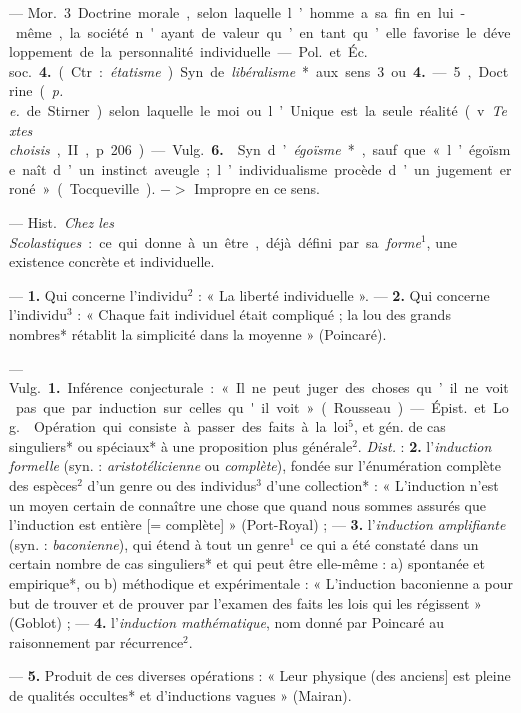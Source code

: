 \begin{itemize}[leftmargin=1cm, label=, itemsep=1pt]
—  \si{Mor.} 3 Doctrine morale, selon laquelle l’homme a sa
fin en lui-même, la société n'ayant de valeur qu’en tant qu’elle favorise le
développement de la personnalité individuelle. — \si{Pol.} et \si{Éc. soc.} 
{\bf 4.} (Ctr. : {\it étatisme}). Syn. de {\it libéralisme}* aux sens 3 ou
{\bf 4.} — 5, Doctrine ({\it p. e.} de Stirner) selon laquelle
le moi ou l’Unique est la seule réalité (v. {\it Textes choisis}, II, p. 206).

— \si{Vulg.} {\bf 6.}  Syn. d’{\it égoïsme}*, sauf que
« l’égoïsme naît d’un instinct aveugle; l’individualisme procède d’un
jugement erroné » (Tocqueville). $->$ Impropre en ce sens.

 — \si{Hist.} {\it Chez les Scolastiques} :
ce qui donne à un être, déjà défini par sa {\it forme}$^1$, une existence
concrète et individuelle.

 — {\bf 1.} Qui concerne l'individu$^2$ : « La liberté
individuelle ». —  {\bf 2.} Qui concerne l’individu$^3$ : « Chaque fait
individuel était compliqué ; la lou des grands nombres* rétablit la
simplicité dans la moyenne » (Poincaré).

 — \si{Vulg.} {\bf 1.} Inférence conjecturale : « Il ne peut
juger des choses qu’il ne voit pas que par induction sur celles qu'il
voit » (Rousseau).

— \si{Épist.} et \si{Log.}  Opération qui consiste à passer
des faits à la loi$^5$, et gén. de cas singuliers* ou spéciaux* à une
proposition plus générale$^2$. {\it Dist.} : {\bf 2.} l'{\it induction
formelle} (syn. : {\it aristotélicienne} ou {\it complète}), fondée sur
l’énumération complète des espèces$^2$ d’un genre ou des individus$^3$ d’une
collection* : « L'induction n’est un moyen certain de connaître une chose que
quand nous sommes assurés que l'induction est entière [= complète] »
(Port-Royal) ; — {\bf 3.} l’{\it induction amplifiante} (syn. :
{\it baconienne}), qui étend à tout un genre$^1$ ce qui a été constaté dans
un certain nombre de cas singuliers* et qui peut être elle-même : a)
spontanée et empirique*, ou b) méthodique et expérimentale : « L’induction
baconienne a pour but de trouver et de
prouver par l’examen des faits les lois qui les régissent » (Goblot) ; —
{\bf 4.} l'{\it induction mathématique}, nom donné par Poincaré au
raisonnement par récurrence$^2$.

— {\bf 5.}  Produit de ces diverses opérations : « Leur
physique (des anciens] est pleine de qualités occultes* et d'inductions
vagues » (Mairan).


\end{itemize}
